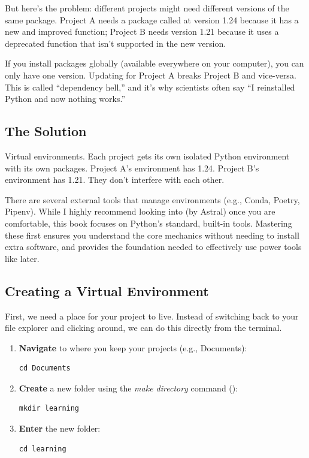 But here's the problem: different projects might need different versions of the same package. Project A needs a package called  at version 1.24 because it has a new and improved function; Project B needs  version 1.21 because it uses a deprecated function that isn't supported in the new version.

If you install packages globally (available everywhere on your computer), you can only have one version. Updating for Project A breaks Project B and vice-versa. This is called ``dependency hell,'' and it's why scientists often say ``I reinstalled Python and now nothing works.''

\subsection{The Solution}

Virtual environments. Each project gets its own isolated Python environment with its own packages. Project A's environment has  1.24. Project B's environment has  1.21. They don't interfere with each other.

There are several external tools that manage environments (e.g., Conda, Poetry, Pipenv). While I highly recommend looking into  (by Astral) once you are comfortable, this book focuses on Python's standard, built-in tools. Mastering these first ensures you understand the core mechanics without needing to install extra software, and provides the foundation needed to effectively use power tools like  later.

\subsection{Creating a Virtual Environment}

First, we need a place for your project to live. Instead of switching back to your file explorer and clicking around, we can do this directly from the terminal.

\begin{enumerate}
    \item \textbf{Navigate} to where you keep your projects (e.g., Documents):
    \begin{lstlisting}[style=shellstyle]
    cd Documents
    \end{lstlisting}

    \item \textbf{Create} a new folder using the \emph{make directory} command ():
    \begin{lstlisting}[style=shellstyle]
    mkdir learning
    \end{lstlisting}

    \item \textbf{Enter} the new folder:
    \begin{lstlisting}[style=shellstyle]
    cd learning
    \end{lstlisting}
\end{enumerate}

